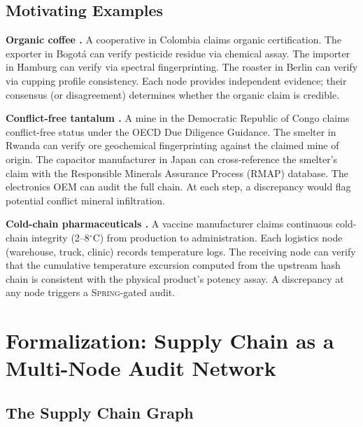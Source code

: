 \documentclass[11pt,a4paper]{article}
\theoremstyle{definition}
\theoremstyle{remark}
\newcommand{\Spring}{\textsc{Spring}}
\begin{document}
\subsection{Motivating Examples }

\textbf{Organic coffee .} A cooperative in Colombia claims organic certification. The exporter in Bogotá can verify pesticide residue via chemical assay. The importer in Hamburg can verify via spectral fingerprinting. The roaster in Berlin can verify via cupping profile consistency. Each node provides independent evidence; their consensus (or disagreement) determines whether the organic claim is credible.

\textbf{Conflict-free tantalum .} A mine in the Democratic Republic of Congo claims conflict-free status under the OECD Due Diligence Guidance. The smelter in Rwanda can verify ore geochemical fingerprinting against the claimed mine of origin. The capacitor manufacturer in Japan can cross-reference the smelter's claim with the Responsible Minerals Assurance Process (RMAP) database. The electronics OEM can audit the full chain. At each step, a discrepancy would flag potential conflict mineral infiltration.

\textbf{Cold-chain pharmaceuticals .} A vaccine manufacturer claims continuous cold-chain integrity (2--8$^\circ$C) from production to administration. Each logistics node (warehouse, truck, clinic) records temperature logs. The receiving node can verify that the cumulative temperature excursion computed from the upstream hash chain is consistent with the physical product's potency assay. A discrepancy at any node triggers a \Spring{}-gated audit.

\section{Formalization: Supply Chain as a Multi-Node Audit Network }
\label{sec:formalization}

\subsection{The Supply Chain Graph }
\end{document}
